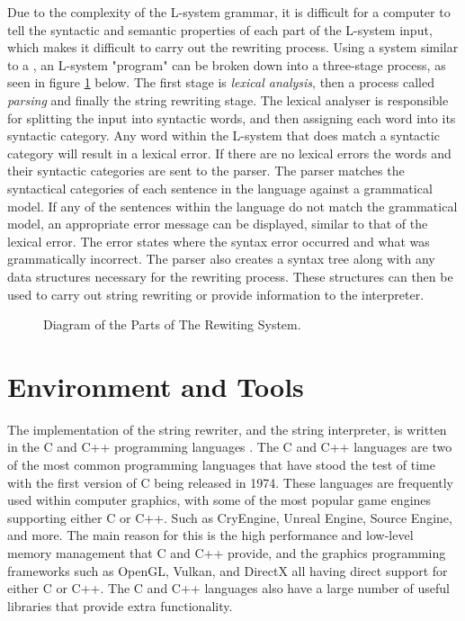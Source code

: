 Due to the complexity of the L-system grammar, it is difficult for a computer to tell the syntactic and semantic properties of each part of the L-system input, which makes it difficult to carry out the rewriting process. Using a system similar to a , an L-system "program" can be broken down into a three-stage process, as seen in figure \ref{3D rotations} below. The first stage is \textit{lexical analysis}, then a process called \textit{parsing} and finally the string rewriting stage. The lexical analyser is responsible for splitting the input into syntactic words, and then assigning each word into its syntactic category. Any word within the L-system that does match a syntactic category will result in a lexical error. If there are no lexical errors the words and their syntactic categories are sent to the parser. The parser matches the syntactical categories of each sentence in the language against a grammatical model. If any of the sentences within the language do not match the grammatical model, an appropriate error message can be displayed, similar to that of the lexical error. The error states where the syntax error occurred and what was grammatically incorrect. The parser also creates a syntax tree along with any data structures necessary for the rewriting process. These structures can then be used to carry out string rewriting or provide information to the interpreter.

\begin{figure}[htbp]
	{\centering
		\setlength{\fboxrule}{1pt}
		\vspace{7px}
		\caption{Diagram of the Parts of The Rewiting System.} \label{3D rotations}
	}
\end{figure}
\FloatBarrier

\section{Environment and Tools}

The implementation of the string rewriter, and the string interpreter, is written in the C and C++ programming languages \cite{stroustrup2000c++}. The C and C++ languages are two of the most common programming languages that have stood the test of time with the first version of C being released in 1974. These languages are frequently used within computer graphics, with some of the most popular game engines supporting either C or C++. Such as CryEngine, Unreal Engine, Source Engine, and more. The main reason for this is the high performance and low-level memory management that C and C++ provide, and the graphics programming frameworks such as OpenGL, Vulkan, and DirectX all having direct support for either C or C++. The C and C++ languages also have a large number of useful libraries that provide extra functionality.  

